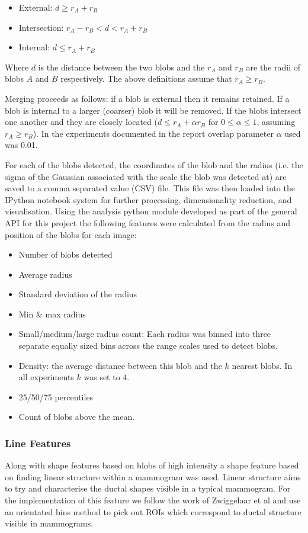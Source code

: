 \begin{itemize}
	\item External: $d \geq r_A + r_B$
	\item Intersection: $r_A - r_B < d < r_A + r_B$
	\item Internal: $d \leq r_A + r_B$
\end{itemize}

Where $d$ is the distance between the two blobs and the $r_A$ and $r_B$ are the radii of blobs $A$ and $B$ respectively. The above definitions assume that $r_A \geq r_B$.

Merging proceeds as follows: if a blob is external then it remains retained. If a blob is internal to a larger (coarser) blob it will be removed. If the blobs intersect one another and they are closely located ($d \leq r_A + \alpha r_B$ for $0 \leq \alpha \leq 1$, assuming $r_A \geq r_B$). In the experiments documented in the report overlap parameter $\alpha$ used was 0.01. 

For each of the blobs detected, the coordinates of the blob and the radius (i.e. the sigma of the Gaussian associated with the scale the blob was detected at) are saved to a comma separated value (CSV) file. This file was then loaded into the IPython notebook system for further processing, dimensionality reduction, and visualisation. Using the analysis python module developed as part of the general API for this project the following features were calculated from the radius and position of the blobs for each image:

\begin{itemize}
	\item Number of blobs detected
	\item Average radius
	\item Standard deviation of the radius
	\item Min \& max radius
	\item Small/medium/large radius count: Each radius was binned into three separate equally sized bins across the range scales used to detect blobs.
	\item Density: the average distance between this blob and the $k$ nearest blobs. In all experiments $k$ was set to 4.
	\item 25/50/75 percentiles
	\item Count of blobs above the mean.
\end{itemize}


\subsubsection{Line Features}
Along with shape features based on blobs of high intensity a shape feature based on finding linear structure within a mammogram was used. Linear structure aims to try and characterise the ductal shapes visible in a typical mammogram. For the implementation of this feature we follow the work of Zwiggelaar et al \cite{zwiggelaar1996finding} and use an orientated bins method to pick out ROIs which correspond to ductal structure visible in mammograms.

